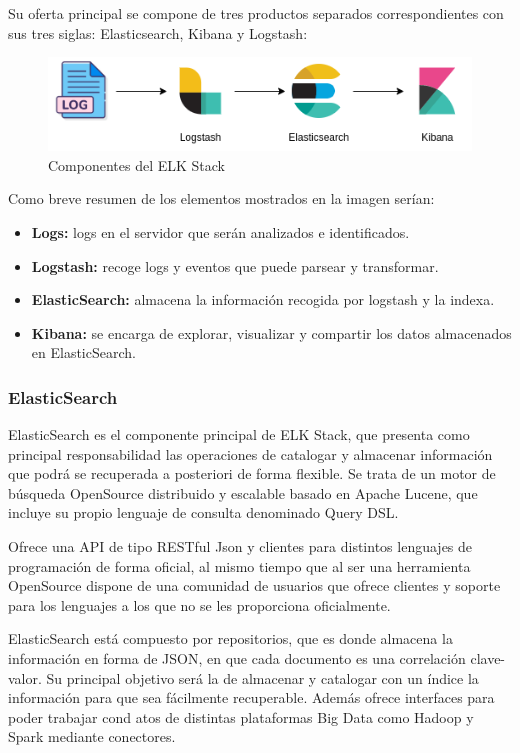 Su oferta principal se compone de tres productos separados correspondientes con sus tres siglas: Elasticsearch, Kibana y Logstash:

\begin{figure}[H]
\centerline{\includegraphics[width=15cm]{figuras/elkstack.png}}
\caption{Componentes del ELK Stack}
\label{enlace1}
\end{figure}

Como breve resumen de los elementos mostrados en la imagen serían:
\begin{itemize}
\item \textbf{Logs:} logs en el servidor que serán analizados e identificados.
\item \textbf{Logstash:} recoge logs y eventos que puede parsear y transformar.
\item \textbf{ElasticSearch:} almacena la información recogida por logstash y la indexa.
\item \textbf{Kibana:} se encarga de explorar, visualizar y compartir los datos almacenados en ElasticSearch.
\end{itemize}

\subsubsection{ElasticSearch}

ElasticSearch es el componente principal de ELK Stack, que presenta como principal responsabilidad las operaciones de catalogar y almacenar información que podrá se recuperada a posteriori de forma flexible. Se trata de un motor de búsqueda OpenSource distribuido y escalable basado en Apache Lucene, que incluye su propio lenguaje de consulta denominado Query DSL. 

Ofrece una API de tipo RESTful Json y clientes para distintos lenguajes de programación de forma oficial, al mismo tiempo que al ser una herramienta OpenSource dispone de una comunidad de usuarios que ofrece clientes y soporte para los lenguajes a los que no se les proporciona oficialmente.

ElasticSearch está compuesto por repositorios, que es donde almacena la información en forma de JSON, en que cada documento es una correlación clave-valor. Su principal objetivo será la de almacenar y catalogar con un índice la información para que sea fácilmente recuperable. Además ofrece interfaces para poder trabajar cond atos de distintas plataformas Big Data como Hadoop y Spark mediante conectores.

